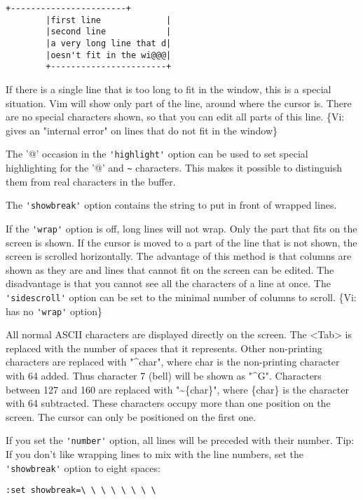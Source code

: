 \begin{Verbatim}[samepage=true]
		+-----------------------+
		|first line             |
		|second line            |
		|a very long line that d|
		|oesn't fit in the wi@@@|
		+-----------------------+
\end{Verbatim}

If there is a single line that is too long to fit in the window, this is a special situation.
Vim will show only part of the line, around where the cursor is.
There are no special characters shown, so that you can edit all parts of this line.
\{Vi: gives an "internal error" on lines that do not fit in the window\}

The '@' occasion in the \verb!'highlight'! option can be used to set special highlighting for the '@' and \verb'~' characters.
This makes it possible to distinguish them from real characters in the buffer.

The \verb!'showbreak'! option contains the string to put in front of wrapped lines.

\label{wrap-off}
If the \verb!'wrap'! option is off, long lines will not wrap.
Only the part that fits on the screen is shown.
If the cursor is moved to a part of the line that is not shown, the screen is scrolled horizontally.
The advantage of this method is that columns are shown as they are and lines that cannot fit on the screen can be edited.
The disadvantage is that you cannot see all the characters of a line at once.
The \verb!'sidescroll'! option can be set to the minimal number of columns to scroll.
\{Vi: has no \verb!'wrap'! option\}

All normal ASCII characters are displayed directly on the screen.
The <Tab> is replaced with the number of spaces that it represents.
Other non-printing characters are replaced with "\textasciicircum {char}", where {char} is the non-printing character with 64 added.
Thus character 7 (bell) will be shown as "\textasciicircum G".
Characters between 127 and 160 are replaced with "\textasciitilde \{char\}", where \{char\} is the character with 64 subtracted.
These characters occupy more than one position on the screen.
The cursor can only be positioned on the first one.

 If you set the \verb!'number'! option, all lines will be preceded with their
 number.  Tip: If you don't like wrapping lines to mix with the line numbers,
 set the \verb!'showbreak'! option to eight spaces:
\begin{Verbatim}[samepage=true]
		:set showbreak=\ \ \ \ \ \ \ \ 
\end{Verbatim}

